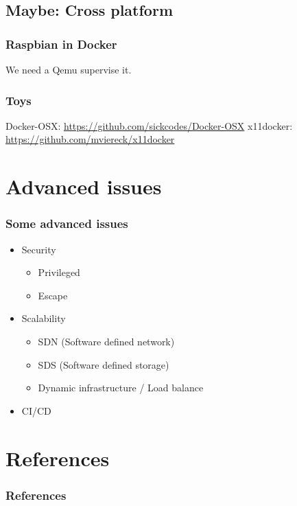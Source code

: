 \documentclass{beamer}
\begin{document}
\subsection{Maybe: Cross platform}
\begin{frame}
    \frametitle{Raspbian in Docker}
    \centering We need a Qemu supervise it.
    
\end{frame}

\begin{frame}
    \frametitle{Toys}
    Docker-OSX: \url{https://github.com/sickcodes/Docker-OSX}
    \newline
    x11docker: \url{https://github.com/mviereck/x11docker}
\end{frame}

\section{Advanced issues}
\begin{frame}
    \frametitle{Some advanced issues}
    \begin{itemize}
        \item Security
              \begin{itemize}
                  \item Privileged
                  \item Escape
              \end{itemize}
        \item Scalability
              \begin{itemize}
                  \item SDN (Software defined network)
                  \item SDS (Software defined storage)
                  \item Dynamic infrastructure / Load balance
              \end{itemize}
        \item CI/CD
    \end{itemize}
\end{frame}

\section{References}
\begin{frame}[t, allowframebreaks]
    \frametitle{References}
    \printbibliography
\end{frame}
\end{document}
